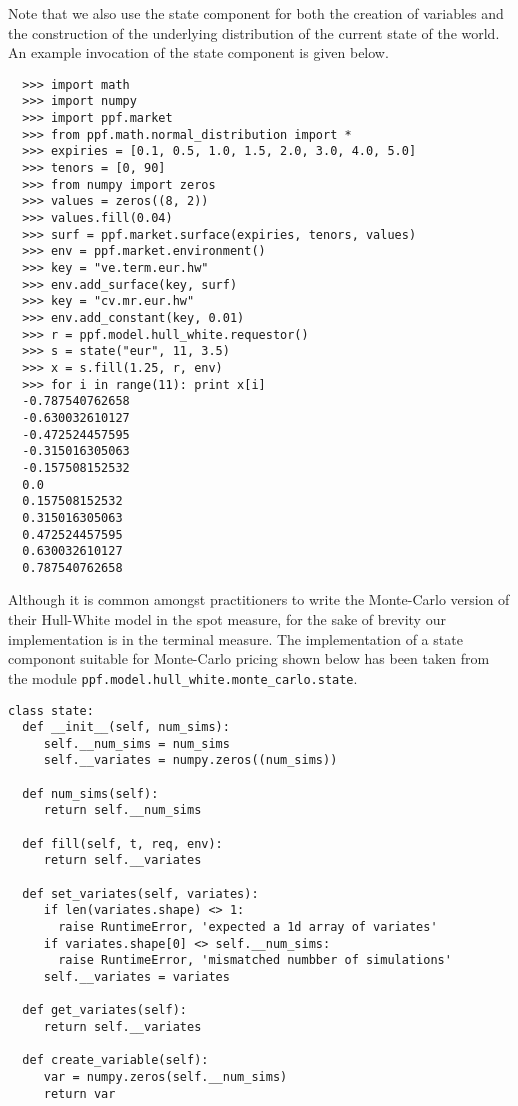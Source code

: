 Note that we also use the state component for both the creation of
variables and the construction of the underlying distribution of the
current state of the world. An example invocation of the state
component is given below.

\begin{verbatim}
  >>> import math
  >>> import numpy
  >>> import ppf.market
  >>> from ppf.math.normal_distribution import *
  >>> expiries = [0.1, 0.5, 1.0, 1.5, 2.0, 3.0, 4.0, 5.0]
  >>> tenors = [0, 90]
  >>> from numpy import zeros
  >>> values = zeros((8, 2))
  >>> values.fill(0.04)
  >>> surf = ppf.market.surface(expiries, tenors, values)
  >>> env = ppf.market.environment()
  >>> key = "ve.term.eur.hw"
  >>> env.add_surface(key, surf)
  >>> key = "cv.mr.eur.hw"
  >>> env.add_constant(key, 0.01)
  >>> r = ppf.model.hull_white.requestor()
  >>> s = state("eur", 11, 3.5)
  >>> x = s.fill(1.25, r, env)
  >>> for i in range(11): print x[i]
  -0.787540762658
  -0.630032610127
  -0.472524457595
  -0.315016305063
  -0.157508152532
  0.0
  0.157508152532
  0.315016305063
  0.472524457595
  0.630032610127
  0.787540762658
\end{verbatim}

Although it is common amongst practitioners to write the Monte-Carlo version of their Hull-White model in the spot measure, for the sake of 
brevity our implementation is in the terminal measure. The implementation of a state componont suitable for Monte-Carlo pricing shown below  
has been taken from the module \verb|ppf.model.hull_white.monte_carlo.state|.

\begin{verbatim}
class state:
  def __init__(self, num_sims):
     self.__num_sims = num_sims
     self.__variates = numpy.zeros((num_sims))

  def num_sims(self):
     return self.__num_sims

  def fill(self, t, req, env):
     return self.__variates

  def set_variates(self, variates):
     if len(variates.shape) <> 1:
       raise RuntimeError, 'expected a 1d array of variates'
     if variates.shape[0] <> self.__num_sims:
       raise RuntimeError, 'mismatched numbber of simulations'
     self.__variates = variates
  
  def get_variates(self):
     return self.__variates

  def create_variable(self):
     var = numpy.zeros(self.__num_sims)
     return var  
\end{verbatim}

